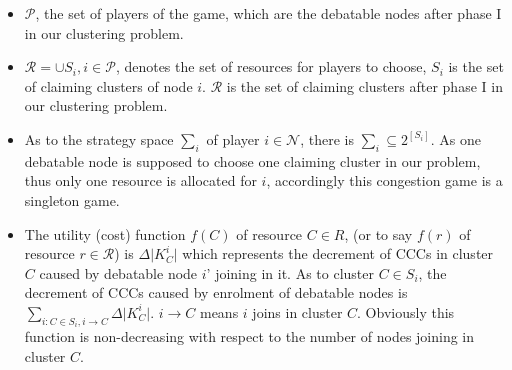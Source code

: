 \begin{itemize}
	\item $\mathcal{P}$, the set of players of the game, which are the debatable nodes after phase I in our clustering problem.
	\item $\mathcal{R} = \cup S_i, i\in \mathcal{P}$, denotes the set of resources for players to choose, $S_i$ is the set of claiming clusters of node $i$. $\mathcal{R}$ is the set of claiming clusters after phase I in our clustering problem.
	\item As to the strategy space $\sum_i$ of player $i\in \mathcal{N}$, there is $\sum_i \subseteq 2^{\left[S_i\right]}$. As one debatable node is supposed to choose one claiming cluster in our problem, thus only one resource is allocated for $i$, accordingly this congestion game is a singleton game.
	
	
	\item %
	The utility (cost) function $f(C)$ of resource $C\in R$, (or to say $f(r)$ of resource $r \in \mathcal{R}$) is $\Delta\vert K^i_C \vert$ which represents the decrement of CCCs in cluster $C$ caused by debatable node $i$' joining in it.
	As to cluster $C\in S_i$, the decrement of CCCs caused by enrolment of debatable nodes is $\sum_{i:C\in S_i, i\rightarrow C} \Delta\vert K^i_C \vert$. 
$i\rightarrow C$ means $i$ joins in cluster $C$.
Obviously this function is non-decreasing with respect to the number of nodes joining in cluster $C$.
	

\end{itemize}
